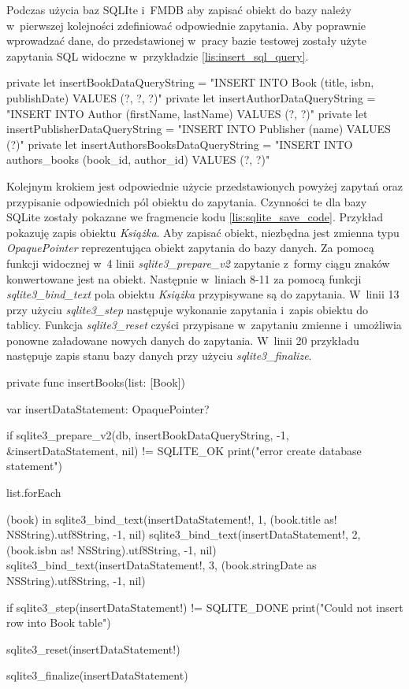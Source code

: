 Podczas użycia baz SQLIte i~FMDB aby zapisać obiekt do bazy należy w~pierwszej kolejności zdefiniować odpowiednie zapytania. Aby poprawnie wprowadzać dane, do przedstawionej w~pracy bazie testowej zostały użyte zapytania SQL widoczne w~przykładzie \ref{lis:insert_sql_query}. 

\begin{code}[
		language=swift,
		caption={Zapytania SQL do wprowadzania danych},
		label={lis:insert_sql_query},
	]
    private let insertBookDataQueryString = "INSERT INTO Book (title, isbn, publishDate) VALUES (?, ?, ?)"
    private let insertAuthorDataQueryString = "INSERT INTO Author (firstName, lastName) VALUES (?, ?)"
    private let insertPublisherDataQueryString = "INSERT INTO Publisher (name) VALUES (?)"
    private let insertAuthorsBooksDataQueryString = "INSERT INTO authors_books (book_id, author_id) VALUES (?, ?)"
\end{code}

Kolejnym krokiem jest odpowiednie użycie przedstawionych powyżej zapytań oraz przypisanie odpowiednich pól obiektu do zapytania. Czynności te dla bazy SQLite zostały pokazane we fragmencie kodu \ref{lis:sqlite_save_code}. Przykład pokazuję zapis obiektu \textit{Książka}. Aby zapisać obiekt, niezbędna jest zmienna typu \textit{OpaquePointer} reprezentująca obiekt zapytania do bazy danych. Za pomocą funkcji widocznej w~4 linii \textit{sqlite3\_prepare\_v2} zapytanie z~formy ciągu znaków konwertowane jest na obiekt. Następnie w~liniach 8-11 za pomocą funkcji \textit{sqlite3\_bind\_text} pola obiektu \textit{Książka} przypisywane są do zapytania. W~linii 13 przy użyciu \textit{sqlite3\_step} następuje wykonanie zapytania i~zapis obiektu do tablicy. Funkcja \textit{sqlite3\_reset} czyści przypisane w~zapytaniu zmienne i~umożliwia ponowne załadowane nowych danych do zapytania. W~linii 20 przykładu następuje zapis stanu bazy danych przy użyciu \textit{sqlite3\_finalize}.

\begin{code}[
		language=swift,
		caption={Przykład zapisu obiektu SQLIte},
		label={lis:sqlite_save_code},
	]
    private func insertBooks(list: [Book]) {
        var insertDataStatement: OpaquePointer?
        
        if sqlite3_prepare_v2(db, insertBookDataQueryString, -1, &insertDataStatement, nil) != SQLITE_OK {
            print("error create database statement")
        }
        
        list.forEach { (book) in
            sqlite3_bind_text(insertDataStatement!, 1, (book.title as! NSString).utf8String, -1, nil)
            sqlite3_bind_text(insertDataStatement!, 2, (book.isbn as! NSString).utf8String, -1, nil)
            sqlite3_bind_text(insertDataStatement!, 3, (book.stringDate as NSString).utf8String, -1, nil)
            
            if sqlite3_step(insertDataStatement!) != SQLITE_DONE {
                print("Could not insert row into Book table")
            }
            
            sqlite3_reset(insertDataStatement!)
        }
        
        sqlite3_finalize(insertDataStatement)
    }
\end{code}

